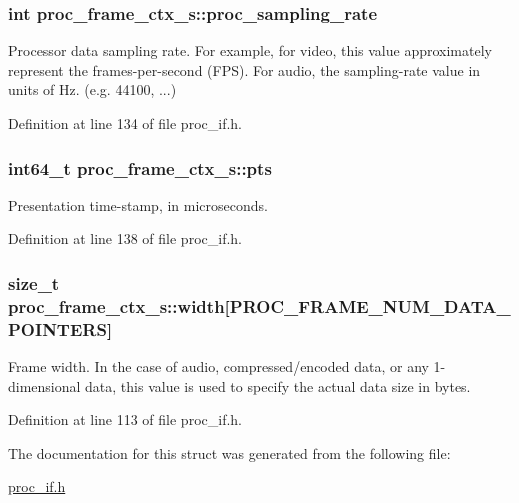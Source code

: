 \subsubsection[{\texorpdfstring{proc\+\_\+sampling\+\_\+rate}{proc_sampling_rate}}]{\setlength{\rightskip}{0pt plus 5cm}int proc\+\_\+frame\+\_\+ctx\+\_\+s\+::proc\+\_\+sampling\+\_\+rate}\hypertarget{structproc__frame__ctx__s_a6b92794eac73a513fe18d5e4847ec4ed}{}\label{structproc__frame__ctx__s_a6b92794eac73a513fe18d5e4847ec4ed}
Processor data sampling rate. For example, for video, this value approximately represent the frames-\/per-\/second (F\+PS). For audio, the sampling-\/rate value in units of Hz. (e.\+g. 44100, ...) 

Definition at line 134 of file proc\+\_\+if.\+h.

\subsubsection[{\texorpdfstring{pts}{pts}}]{\setlength{\rightskip}{0pt plus 5cm}int64\+\_\+t proc\+\_\+frame\+\_\+ctx\+\_\+s\+::pts}\hypertarget{structproc__frame__ctx__s_ab08e6752be55e23d4a37ec37931a30b9}{}\label{structproc__frame__ctx__s_ab08e6752be55e23d4a37ec37931a30b9}
Presentation time-\/stamp, in microseconds. 

Definition at line 138 of file proc\+\_\+if.\+h.

\subsubsection[{\texorpdfstring{width}{width}}]{\setlength{\rightskip}{0pt plus 5cm}size\+\_\+t proc\+\_\+frame\+\_\+ctx\+\_\+s\+::width\mbox{[}P\+R\+O\+C\+\_\+\+F\+R\+A\+M\+E\+\_\+\+N\+U\+M\+\_\+\+D\+A\+T\+A\+\_\+\+P\+O\+I\+N\+T\+E\+RS\mbox{]}}\hypertarget{structproc__frame__ctx__s_ae6221b8581a9b08b7fceaa08050dbeb5}{}\label{structproc__frame__ctx__s_ae6221b8581a9b08b7fceaa08050dbeb5}
Frame width. In the case of audio, compressed/encoded data, or any 1-\/dimensional data, this value is used to specify the actual data size in bytes. 

Definition at line 113 of file proc\+\_\+if.\+h.



The documentation for this struct was generated from the following file\+:\begin{DoxyCompactItemize}
\item 
\hyperlink{proc__if_8h}{proc\+\_\+if.\+h}\end{DoxyCompactItemize}
